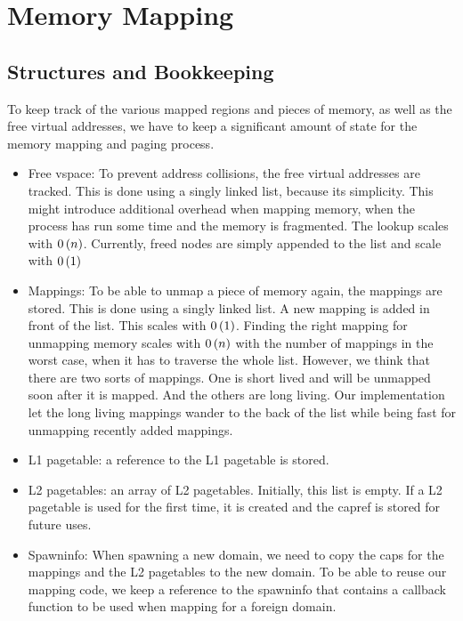 \section{Memory Mapping}\label{s:mapping}
\subsection{Structures and Bookkeeping}\label{ss:mapping_structures}
To keep track of the various mapped regions and pieces of memory, as well as the free virtual addresses, we have to keep a significant amount of state for the memory mapping and paging process.
\begin{itemize}
	\item Free vspace: To prevent address collisions, the free virtual addresses are tracked. This is done using a singly linked list, because its simplicity. This might introduce additional overhead when mapping memory, when the process has run some time and the memory is fragmented. The lookup scales with $0\left( n \right)$. Currently, freed nodes are simply appended to the list and scale with $0\left( 1 \right)$ 
	\item Mappings: To be able to unmap a piece of memory again, the mappings are stored. This is done using a singly linked list. A new mapping is added in front of the list. This scales with $0\left( 1 \right)$. Finding the right mapping for unmapping memory scales with $0\left( n \right)$ with the number of mappings in the worst case, when it has to traverse the whole list. However, we think that there are two sorts of mappings. One is short lived and will be unmapped soon after it is mapped. And the others are long living. Our implementation let the long living mappings wander to the back of the list while being fast for unmapping recently added mappings.
	\item L1 pagetable: a reference to the L1 pagetable is stored.
	\item L2 pagetables: an array of L2 pagetables. Initially, this list is empty. If a L2 pagetable is used for the first time, it is created and the capref is stored for future uses.
	\item Spawninfo: When spawning a new domain, we need to copy the caps for the mappings and the L2 pagetables to the new domain. To be able to reuse our mapping code, we keep a reference to the spawninfo that contains a callback function to be used when mapping for a foreign domain.
\end{itemize}

